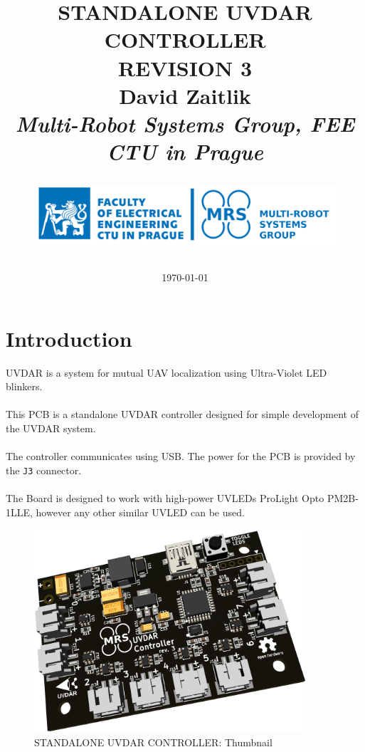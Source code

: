 \documentclass[12pt, a4paper]{article}
\title{
\Huge{STANDALONE UVDAR CONTROLLER}\\
REVISION 3\\
\vspace{0.5cm}
\LARGE{David Zaitlik}\\
\vspace{0.5cm}
\normalsize{\textit{Multi-Robot Systems Group, FEE CTU in Prague}}\\
\vspace{1.5cm}
\vfill
\begin{figure}[h]
\centering
\includegraphics[width=\textwidth]{figures/logo_CTU_FEE_MRS_blue.png}
\end{figure}
\date{\today}

}
\begin{document}
\clearpage
\maketitle
\thispagestyle{empty}

\pagebreak
\tableofcontents
\listoffigures
\listoftables
\thispagestyle{empty}

\pagebreak
\setcounter{page}{1}
\section{Introduction}
UVDAR is a system for mutual UAV localization using Ultra-Violet LED blinkers.\\
\\
This PCB is a standalone UVDAR controller designed for simple development of the UVDAR system.\\
\\
The controller communicates using USB. The power for the PCB is provided by the \verb|J3| connector.\\
\\
The Board is designed to work with high-power UVLEDs ProLight Opto PM2B-1LLE, however any other similar UVLED can be used.\\
\begin{figure}[h]
\centering
\includegraphics[width=0.9\textwidth]{figures/Thumbnail.png}
\caption{STANDALONE UVDAR CONTROLLER: Thumbnail}
\label{fig:thumbnail}
\end{figure}

\pagebreak
\end{document}
